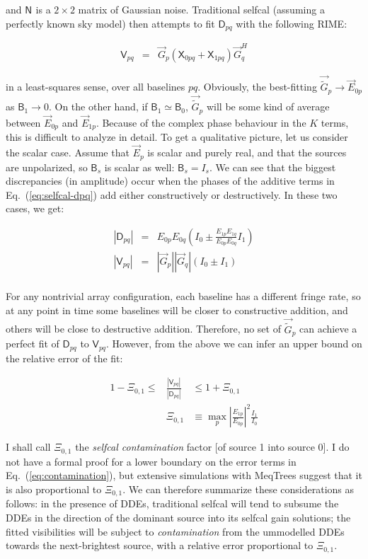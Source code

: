 \documentclass{aa}
\newcommand{\herm}{H}
\newcommand{\jones}[2]{\vec {#1}_{#2}}
\newcommand{\jonesT}[2]{\vec {#1}^{\herm}_{#2}}
\newcommand{\coh}[2]{\mathsf{{#1}}_{{#2}}}
\begin{document}
and $\coh{N}{}$ is a $2\times2$ matrix of Gaussian noise. Traditional selfcal (assuming a perfectly known sky model) then attempts to fit $\coh{D}{pq}$ with the following RIME:

\begin{eqnarray}\label{eq:selfcal-vpq}
\coh{V}{pq} & = & \jones{G}{p} ( \coh{X}{0pq} + \coh{X}{1pq} ) \jonesT{G}{q}
\end{eqnarray}

in a least-squares sense, over all baselines $pq$. Obviously, the best-fitting $\jones{\tilde G}{p}\to\jones{E}{0p}$ as $\coh{B}{1}\to0$. On the other hand, if $\coh{B}{1}\simeq\coh{B}{0}$, $\jones{\tilde G}{p}$ will be some kind of average between $\jones{E}{0p}$ and $\jones{E}{1p}$. Because of the complex phase behaviour in the $K$ terms, this is difficult to analyze in detail. To get a qualitative picture, let us consider the scalar case. Assume that $\jones{E}{p}$ is scalar and purely real, and that the sources are unpolarized, so $\coh{B}{s}$ is scalar as well: $\coh{B}{s}=I_s$. We can see that the biggest discrepancies (in amplitude) occur when the phases of the additive terms in Eq.~(\ref{eq:selfcal-dpq}) add either constructively or destructively. In these two cases, we get:

\begin{eqnarray*}
|\coh{D}{pq}| & = & E_{0p} E_{0q} ( I_0 \pm \frac{E_{1p} E_{1q}}{E_{0p} E_{0q}} I_1 ) \\
|\coh{V}{pq}| & = & |\jones{G}{p}| |\jones{G}{q}| ( I_0 \pm I_1 ) \\
\end{eqnarray*}

For any nontrivial array configuration, each baseline has a different fringe rate, so at any point in time some baselines will be closer to constructive addition, and others will be close to destructive addition. Therefore, no set of
$\jones{\tilde G}{p}$ can achieve a perfect fit of $\coh{D}{pq}$ to $\coh{V}{pq}$. However, from the above we can infer an upper bound on the relative error of the fit:

\begin{eqnarray}\label{eq:contamination}
1 -\Xi_{0,1} \le & { \displaystyle \frac{|\coh{V}{pq}|}{|\coh{D}{pq}|} } & \le 1 + \Xi_{0,1} \\
\nonumber & \Xi_{0,1} & \equiv \max_p \left| \frac{E_{1p}}{E_{0p}} \right|^2\frac{I_1}{I_0}
\end{eqnarray}

I shall call $\Xi_{0,1}$ the \emph{selfcal contamination} factor [of source 1 into source 0]. I do not have a formal proof for a lower boundary on the error terms in Eq.~(\ref{eq:contamination}), but extensive simulations with MeqTrees suggest that it is also proportional to $\Xi_{0,1}$. We can therefore summarize these considerations as follows: in the presence of DDEs, traditional selfcal will tend to subsume the DDEs in the direction of the dominant source into its selfcal gain solutions; the fitted visibilities will be subject to \emph{contamination} from the ummodelled DDEs towards the next-brightest source, with a relative error proportional to $\Xi_{0,1}$.
\end{document}

